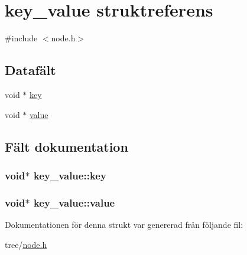 \hypertarget{structkey__value}{\section{key\+\_\+value struktreferens}
\label{structkey__value}
}


{\ttfamily \#include $<$node.\+h$>$}

\subsection*{Datafält}
\begin{DoxyCompactItemize}
\item 
void $\ast$ \hyperlink{structkey__value_a43a92ed366b412e8aa7c8a664d71e685}{key}
\item 
void $\ast$ \hyperlink{structkey__value_ae0993347bcd5222afe71d54d043f990e}{value}
\end{DoxyCompactItemize}


\subsection{Fält dokumentation}
\hypertarget{structkey__value_a43a92ed366b412e8aa7c8a664d71e685}{
\subsubsection[{key}]{\setlength{\rightskip}{0pt plus 5cm}void$\ast$ key\+\_\+value\+::key}}\label{structkey__value_a43a92ed366b412e8aa7c8a664d71e685}
\hypertarget{structkey__value_ae0993347bcd5222afe71d54d043f990e}{
\subsubsection[{value}]{\setlength{\rightskip}{0pt plus 5cm}void$\ast$ key\+\_\+value\+::value}}\label{structkey__value_ae0993347bcd5222afe71d54d043f990e}


Dokumentationen för denna strukt var genererad från följande fil\+:\begin{DoxyCompactItemize}
\item 
tree/\hyperlink{node_8h}{node.\+h}\end{DoxyCompactItemize}
